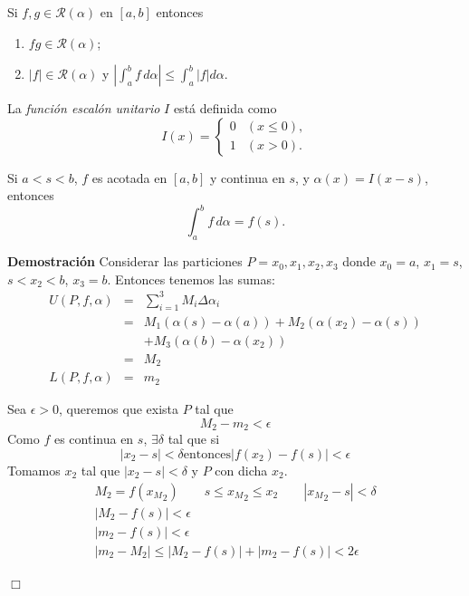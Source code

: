\documentclass[10pt]{beamer}
\begin{document}
\begin{frame}

\begin{theorem}[9]
Si $f, g \in \mathcal{R}(\alpha)$ en $[a, b]$ entonces
\begin{enumerate}
	\item $fg \in \mathcal{R}(\alpha)$;
	\item $|f| \in \mathcal{R}(\alpha)$ y $\left|\int_a^b f\,d\alpha\right| \leq \int_a^b |f| d\alpha$.
\end{enumerate}
\end{theorem}

\begin{definition}
La \textit{función escalón unitario} $I$ está definida como
\[
	I(x) = \begin{cases}
		0 & (x \leq 0),\\
		1 & (x > 0).
	\end{cases}
\]
\end{definition}
\end{frame}

\begin{frame}[allowframebreaks]

\begin{theorem}[10]
Si $a < s < b$, $f$ es acotada en $[a, b]$ y continua en $s$, y $\alpha(x) = I(x-s)$, entonces
\[
	\int_a^b f\,d\alpha = f(s).
\]
\end{theorem}
\textbf{Demostración}
Considerar las particiones $P = {x_0, x_1, x_2, x_3}$ donde $x_0 = a$, $x_1=s$, $s<x_2<b$, $x_3 = b$.
Entonces tenemos las sumas:
\[
	\begin{array}{rcl}
		U(P, f, \alpha) & = & \sum_{i=1}^3 M_i \Delta\alpha_i \\
		& = & M_1(\alpha(s)-\alpha(a)) + M_2(\alpha(x_2)-\alpha(s)) \\
		& & + M_3(\alpha(b)-\alpha(x_2)) \\
		& = & M_2\\
		L(P, f, \alpha) & = & m_2
	\end{array}
\]

Sea $\epsilon>0$, queremos que exista $P$ tal que
\[
	M_2 - m_2 < \epsilon
\]
Como $f$ es continua en $s$, $\exists \delta$ tal que si
\[
	|x_2-s|<\delta \text{entonces} |f(x_2)-f(s)|<\epsilon
\]
Tomamos $x_2$ tal que $|x_2-s|<\delta$ y $P$ con dicha $x_2$.
\[
	\begin{array}{c}
		M_2 = f({x_M}_2) \qquad s \leq {x_M}_2 \leq x_2 \qquad |{x_M}_2-s|<\delta \\
		|M_2-f(s)|<\epsilon\\
		|m_2-f(s)|<\epsilon\\
		|m_2 - M_2| \leq |M_2 - f(s)| + |m_2 - f(s)| < 2\epsilon
	\end{array}
\]
\begin{flushright}
$\Box$
\end{flushright}

\end{frame}
\end{document}
